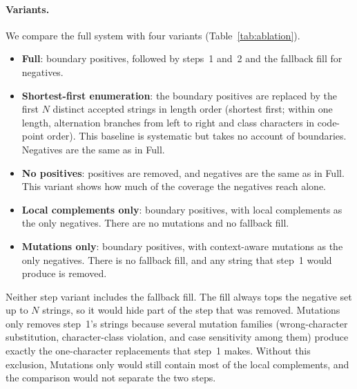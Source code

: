 \paragraph{Variants.}
We compare the full system with four variants (Table~\ref{tab:ablation}).
\begin{itemize}
  \item \textbf{Full}: boundary positives, followed by steps~1 and~2 and the
    fallback fill for negatives.
  \item \textbf{Shortest-first enumeration}: the boundary positives are replaced by
    the first $N$ distinct accepted strings in length order (shortest first; within
    one length, alternation branches from left to right and class characters in
    code-point order). This baseline is systematic but takes no account of
    boundaries. Negatives are the same as in Full.
  \item \textbf{No positives}: positives are removed, and negatives are the same as
    in Full. This variant shows how much of the coverage the negatives reach alone.
  \item \textbf{Local complements only}: boundary positives, with local complements as the only
    negatives. There are no mutations and no fallback fill.
  \item \textbf{Mutations only}: boundary positives, with context-aware mutations as the
    only negatives. There is no fallback fill, and any string that step~1 would
    produce is removed.
\end{itemize}
Neither step variant includes the fallback fill. The fill always tops the
negative set up to $N$ strings, so it would hide part of the step that was
removed. Mutations only removes step~1's strings because several mutation families
(wrong-character substitution, character-class violation, and case sensitivity
among them) produce exactly the one-character replacements that step~1 makes.
Without this exclusion, Mutations only would still contain most of the local
complements, and the comparison would not separate the two steps.

